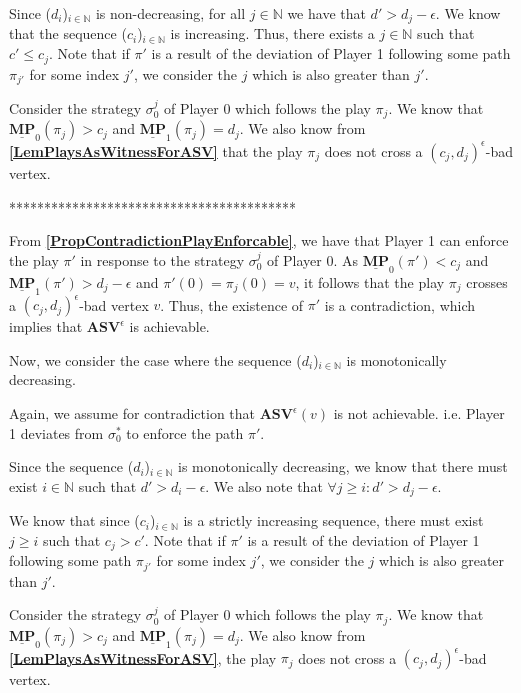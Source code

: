 Since ($d_i$)$_{i \in \mathbb{N}}$ is non-decreasing, for all $j \in \mathbb{N}$ we have that $d' > d_j - \epsilon$. We know that the sequence ($c_i$)$_{i \in \mathbb{N}}$ is increasing. Thus, there exists a $j \in \mathbb{N}$ such that $c' \leqslant c_j$. Note that if $\pi'$ is a result of the deviation of Player 1 following some path $\pi_{j'}$ for some index $j'$, we consider the $j$ which is also greater than $j'$.

Consider the strategy $\sigma_0^j$ of Player 0 which follows the play $\pi_j$. We know that $\underline{\mathbf{MP}}_0(\pi_j) > c_j$ and $\underline{\mathbf{MP}}_1(\pi_j) = d_j$. We also know from \textbf{\cref{LemPlaysAsWitnessForASV}} that the play $\pi_j$ does not cross a $(c_j, d_j)^{\epsilon}$-bad vertex. 

*****************************************

From \textbf{\cref{PropContradictionPlayEnforcable}}, we have that Player 1 can enforce the play $\pi'$ in response to the strategy $\sigma_0^j$ of Player 0. As $\underline{\mathbf{MP}}_0(\pi') < c_j$ and $ \underline{\mathbf{MP}}_1(\pi') > d_j-\epsilon$ and $\pi'(0) = \pi_j(0) = v$, it follows that the play $\pi_j$ crosses a $(c_j, d_j)^{\epsilon}$-bad vertex $v$. Thus, the existence of $\pi'$ is a contradiction, which implies that $\mathbf{ASV}^{\epsilon}$ is achievable.

Now, we consider the case where the sequence ($d_i$)$_{i \in \mathbb{N}}$ is monotonically decreasing.

Again, we assume for contradiction that $\mathbf{ASV}^{\epsilon}(v)$ is not achievable.  i.e. Player 1 deviates from $\sigma_0^*$ to enforce the path $\pi'$.

Since the sequence ($d_i$)$_{i \in \mathbb{N}}$ is monotonically decreasing, we know that there must exist $i \in \mathbb{N}$ such that $d' > d_i - \epsilon$. We also note that $\forall j \geqslant i: d' > d_j - \epsilon$.

We know that since ($c_i$)$_{i \in \mathbb{N}}$ is a strictly increasing sequence, there must exist $j \geqslant i$ such that $c_j > c'$. Note that if $\pi'$ is a result of the deviation of Player 1 following some path $\pi_{j'}$ for some index $j'$, we consider the $j$ which is also greater than $j'$.

Consider the strategy $\sigma_0^j$ of Player 0 which follows the play $\pi_j$. We know that $\underline{\mathbf{MP}}_0(\pi_j) > c_j$ and $ \underline{\mathbf{MP}}_1(\pi_j) = d_j$. We also know from \textbf{\cref{LemPlaysAsWitnessForASV}}, the play $\pi_j$ does not cross a $(c_j, d_j)^{\epsilon}$-bad vertex. 

